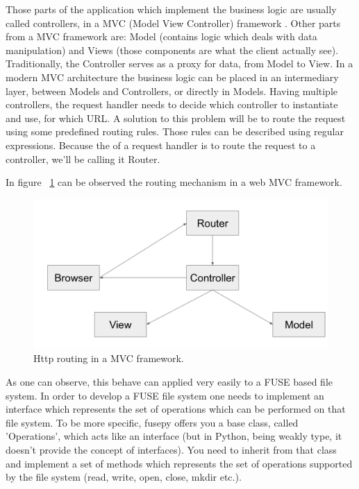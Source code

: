 Those parts of the application which implement the business logic are usually called controllers, in a MVC (Model View Controller) framework \cite{Deacon2009}. Other parts from a MVC framework are: Model (contains logic which deals with data manipulation) and Views (those components are what the client actually see). Traditionally, the Controller serves as a proxy for data, from Model to View. In a modern MVC architecture the business logic can be placed in an intermediary layer, between Models and Controllers, or directly in Models. Having multiple controllers, the request handler needs to decide which controller to instantiate and use, for which URL. A solution to this problem will be to route the request using some predefined routing rules. Those rules can be described using regular expressions. Because the of a request handler is to route the request to a controller, we'll be calling it Router.

In figure ~\ref{fig:routing} can be observed the routing mechanism in a web MVC framework.

\begin{figure}[h]
  \begin{center}
    \includegraphics[width=15cm]{layout/mvc.png}
    \caption{Http routing in a MVC framework.}
    \label{fig:routing}
  \end{center}
\end{figure}

As one can observe, this behave can applied very easily to a FUSE based file system. In order to develop a FUSE file system one needs to implement an interface which represents the set of operations which can be performed on that file system. To be more specific, fusepy offers you a base class, called 'Operations', which acts like an interface (but in Python, being weakly type, it doesn't provide the concept of interfaces). You need to inherit from that class and implement a set of methods which represents the set of operations supported by the file system (read, write, open, close, mkdir etc.).

